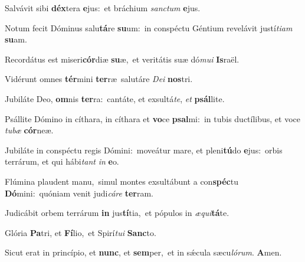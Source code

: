 \vs Salvávit sibi \textbf{déx}tera \textbf{e}jus:~\redgreheightstar et bráchium \textit{sanc}\textit{tum} \textbf{e}jus.

\vs Notum fecit Dóminus salu\textbf{tá}re \textbf{su}um:~\redgreheightstar in conspéctu Géntium revelávit justí\textit{ti}\textit{am} \textbf{su}am.

\vs Recordátus est miseri\textbf{cór}diæ \textbf{su}æ,~\redgreheightstar et veritátis suæ dó\textit{mu}\textit{i} \textbf{Is}raël.

\vs Vidérunt omnes \textbf{tér}mini \textbf{ter}ræ~\redgreheightstar salutáre \textit{De}\textit{i} \textbf{nos}tri.

\vs Jubiláte Deo, \textbf{om}nis \textbf{ter}ra:~\redgreheightstar cantáte, et exsultá\textit{te}, \textit{et} \textbf{psál}lite.

\vs Psállite Dómino in cíthara, in cíthara et \textbf{vo}ce \textbf{psal}mi:~\redgreheightstar in tubis ductílibus, et voce \textit{tu}\textit{bæ} \textbf{cór}neæ.

\vs Jubiláte in conspéctu regis Dómini:~\reddagger moveátur mare, et pleni\textbf{tú}do \textbf{e}jus:~\redgreheightstar orbis terrárum, et qui hábi\textit{tant} \textit{in} \textbf{e}o.

\vs Flúmina plaudent manu,~\reddagger simul montes exsultábunt a con\textbf{spéc}tu \textbf{Dó}mini:~\redgreheightstar quóniam venit judi\textit{cá}\textit{re} \textbf{ter}ram.

\vs Judicábit orbem terrárum \textbf{in} jus\textbf{tí}tia,~\redgreheightstar et pópulos in \textit{æ}\textit{qui}\textbf{tá}te.

\vs Glória \textbf{Pa}tri, et \textbf{Fí}lio,~\redgreheightstar et Spirí\textit{tu}\textit{i} \textbf{Sanc}to.

\vs Sicut erat in princípio, et \textbf{nunc}, et \textbf{sem}per,~\redgreheightstar et in sǽcula sæcu\textit{ló}\textit{rum}. \textbf{A}men.
